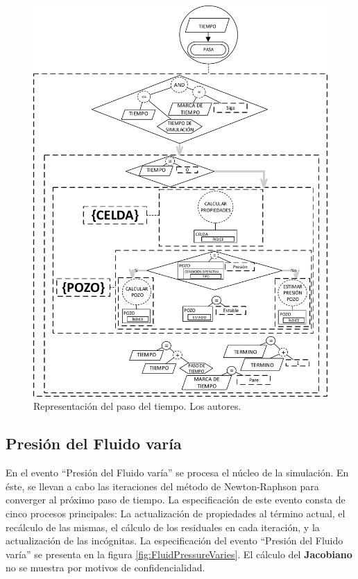 \begin{figure}[h]
	\centering%
	\includegraphics[width=0.7\linewidth]{Fig/TiempoPasa.pdf}%
	\caption[Representación del paso del tiempo.]{Representación del paso del tiempo. Los autores.} \label{fig:TimePasses}
\end{figure}


\subsection{Presión del Fluido varía}\label{sec:PS_FluidVaries}
En el evento ``Presión del Fluido varía'' se procesa el núcleo de la simulación. En éste, se llevan a cabo las iteraciones del método de Newton-Raphson para converger al próximo paso de tiempo. La especificación de este evento consta de cinco procesos principales: La actualización de propiedades al término actual, el recálculo de las mismas, el cálculo de los residuales en cada iteración, y la actualización de las incógnitas. La especificación del evento ``Presión del Fluido varía'' se presenta en la figura \ref{fig:FluidPressureVaries}. El cálculo del \textbf{Jacobiano} no se muestra por motivos de confidencialidad.\\

